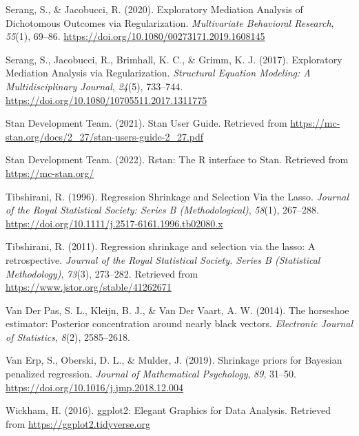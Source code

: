 \documentclass[
  man, donotrepeattitle,floatsintext]{apa6}
\newlength{\cslhangindent}
\newlength{\cslentryspacingunit} %
\newenvironment{CSLReferences}[2] %
 {%
  \setlength{\parindent}{0pt}
  \ifodd #1
  \let\oldpar\par
  \def\par{\hangindent=\cslhangindent\oldpar}
  \fi
  \setlength{\parskip}{#2\cslentryspacingunit}
 }%
 {}
\begin{document}
\begin{CSLReferences}{1}{0}
\leavevmode{}%
Serang, S., \& Jacobucci, R. (2020). Exploratory {Mediation} {Analysis} of {Dichotomous} {Outcomes} via {Regularization}. \emph{Multivariate Behavioral Research}, \emph{55}(1), 69--86. \url{https://doi.org/10.1080/00273171.2019.1608145}

\leavevmode{}%
Serang, S., Jacobucci, R., Brimhall, K. C., \& Grimm, K. J. (2017). Exploratory {Mediation} {Analysis} via {Regularization}. \emph{Structural Equation Modeling: A Multidisciplinary Journal}, \emph{24}(5), 733--744. \url{https://doi.org/10.1080/10705511.2017.1311775}

\leavevmode{}%
Stan Development Team. (2021). Stan {User} {Guide}. Retrieved from \url{https://mc-stan.org/docs/2_27/stan-users-guide-2_27.pdf}

\leavevmode{}%
Stan Development Team. (2022). Rstan: The {R} interface to {Stan}. Retrieved from \url{https://mc-stan.org/}

\leavevmode{}%
Tibshirani, R. (1996). Regression {Shrinkage} and {Selection} {Via} the {Lasso}. \emph{Journal of the Royal Statistical Society: Series B (Methodological)}, \emph{58}(1), 267--288. \url{https://doi.org/10.1111/j.2517-6161.1996.tb02080.x}

\leavevmode{}%
Tibshirani, R. (2011). Regression shrinkage and selection via the lasso: A retrospective. \emph{Journal of the Royal Statistical Society. Series B (Statistical Methodology)}, \emph{73}(3), 273--282. Retrieved from \url{https://www.jstor.org/stable/41262671}

\leavevmode{}%
Van Der Pas, S. L., Kleijn, B. J., \& Van Der Vaart, A. W. (2014). The horseshoe estimator: {Posterior} concentration around nearly black vectors. \emph{Electronic Journal of Statistics}, \emph{8}(2), 2585--2618.

\leavevmode{}%
Van Erp, S., Oberski, D. L., \& Mulder, J. (2019). Shrinkage priors for {Bayesian} penalized regression. \emph{Journal of Mathematical Psychology}, \emph{89}, 31--50. \url{https://doi.org/10.1016/j.jmp.2018.12.004}

\leavevmode{}%
Wickham, H. (2016). ggplot2: {Elegant} {Graphics} for {Data} {Analysis}. Retrieved from \url{https://ggplot2.tidyverse.org}


\end{CSLReferences}
\end{document}
